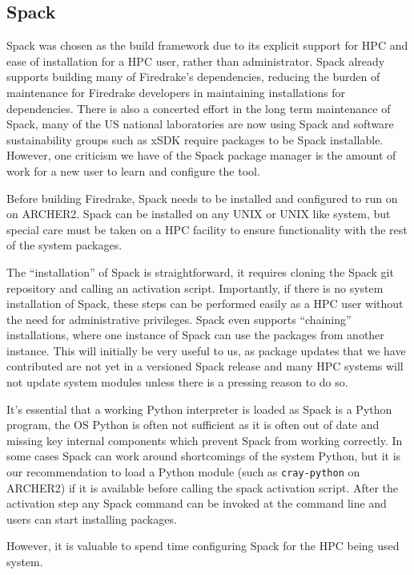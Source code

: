 \documentclass[a4paper,11pt]{article}
\begin{document}
\subsection{Spack}
\label{ssec:spack}
Spack was chosen as the build framework due to its explicit support for HPC and ease of installation for a HPC user, rather than administrator.
Spack already supports building many of Firedrake's dependencies, reducing the burden of maintenance for Firedrake developers in maintaining installations for dependencies.
There is also a concerted effort in the long term maintenance of Spack, many of the US national laboratories are now using Spack and software sustainability groups such as xSDK require packages to be Spack installable.
However, one criticism we have of the Spack package manager is the amount of work for a new user to learn and configure the tool.

Before building Firedrake, Spack needs to be installed and configured to run on on ARCHER2.
Spack can be installed on any UNIX or UNIX like system, but special care must be taken on a HPC facility to ensure functionality with the rest of the system packages.

The ``installation'' of Spack is straightforward, it requires cloning the Spack git repository and calling an activation script.
Importantly, if there is no system installation of Spack, these steps can be performed easily as a HPC user without the need for administrative privileges.
Spack even supports ``chaining'' installations, where one instance of Spack can use the packages from another instance.
This will initially be very useful to us, as package updates that we have contributed are not yet in a versioned Spack release and many HPC systems will not update system modules unless there is a pressing reason to do so.

It's essential that a working Python interpreter is loaded as Spack is a Python program, the OS Python is often not sufficient as it is often out of date and missing key internal components which prevent Spack from working correctly.
In some cases Spack can work around shortcomings of the system Python, but it is our recommendation to load a Python module (such as \verb`cray-python` on ARCHER2) if it is available before calling the spack activation script.
After the activation step any Spack command can be invoked at the command line and users can start installing packages.

However, it is valuable to spend time configuring Spack for the HPC being used system.
\end{document}

